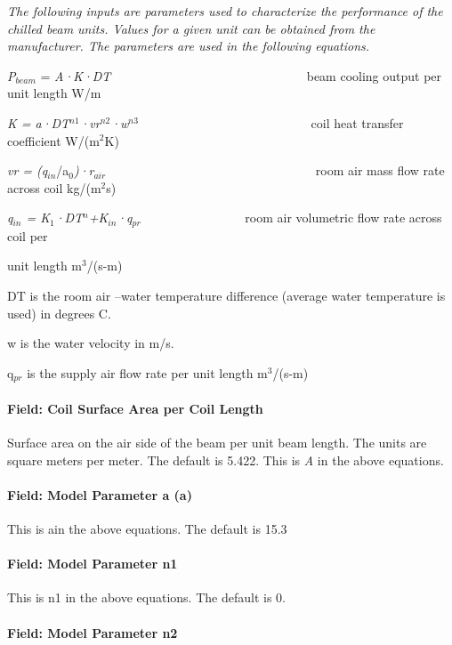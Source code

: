 \emph{The following inputs are parameters used to characterize the performance of the chilled beam units. Values for a given unit can be obtained from the manufacturer. The parameters are used in the following equations.~~~~~}

\emph{P\(_{beam}\)} = \emph{A·K·DT~~~~~~~} ~~~~~~~~~~~~~~~~~~~~~~~ beam cooling output per unit length W/m

\emph{K = a·DT\(^{n1}\)·vr\(^{n2}\)·w\(^{n3}\)}~~~~~~~~~~~~~~~~~~~~~~~~~~~ coil heat transfer coefficient W/(m\(^{2}\)K)

\emph{vr = (q\(_{in}\)}/a\emph{\(_{0}\))·r\(_{air}\)}~~~~~~~~~~~~~~~~~~~~~~~~~~~~~~~~~ room air mass flow rate across coil kg/(m\(^{2}\)s)

\emph{q\(_{in}\) = K\(_{1}\)·DT\(^{n}\)+K\(_{in}\)·q\(_{pr}\)}~~~~~~~~~~~~~~~~ room air volumetric flow rate across coil per

unit length m\(^{3}\)/(s-m)

DT is the room air --water temperature difference (average water temperature is used) in degrees C.

w is the water velocity in m/s.

q\(_{pr}\) is the supply air flow rate per unit length m\(^{3}\)/(s-m)

\paragraph{Field: Coil Surface Area per Coil Length}\label{field-coil-surface-area-per-coil-length}

Surface area on the air side of the beam per unit beam length. The units are square meters per meter. The default is 5.422. This is \emph{A} in the above equations.

\paragraph{Field: Model Parameter a (a)}\label{field-model-parameter-a-a}

This is ain the above equations. The default is 15.3

\paragraph{Field: Model Parameter n1}\label{field-model-parameter-n1}

This is n1 in the above equations. The default is 0.

\paragraph{Field: Model Parameter n2}\label{field-model-parameter-n2}

